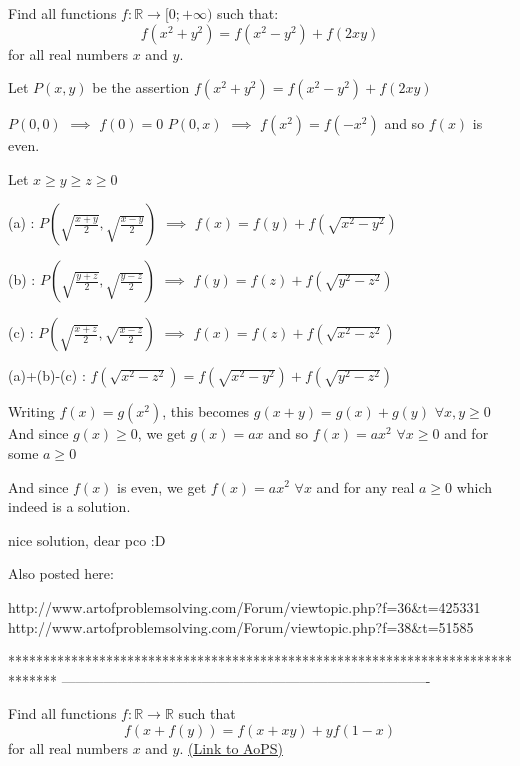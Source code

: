 \begin{solution}
	\begin{tcolorbox}
Find all functions $f: \mathbb{R}\to [0;+\infty)$ such that: 
\[f(x^2+y^2)=f(x^2-y^2)+f(2xy)\]
for all real numbers $x$ and $y$.\end{tcolorbox}
Let $P(x,y)$ be the assertion $f(x^2+y^2)=f(x^2-y^2)+f(2xy)$

$P(0,0)$ $\implies$ $f(0)=0$
$P(0,x)$ $\implies$ $f(x^2)=f(-x^2)$ and so $f(x)$ is even.

Let $x\ge y\ge z\ge 0$

(a) : $P(\sqrt{\frac {x+y}2},\sqrt{\frac{x-y}2})$ $\implies$ $f(x)=f(y)+f(\sqrt{x^2-y^2})$

(b) : $P(\sqrt{\frac {y+z}2},\sqrt{\frac{y-z}2})$ $\implies$ $f(y)=f(z)+f(\sqrt{y^2-z^2})$

(c) : $P(\sqrt{\frac {x+z}2},\sqrt{\frac{x-z}2})$ $\implies$ $f(x)=f(z)+f(\sqrt{x^2-z^2})$

(a)+(b)-(c) : $f(\sqrt{x^2-z^2})=f(\sqrt{x^2-y^2})+f(\sqrt{y^2-z^2})$

Writing $f(x)=g(x^2)$, this becomes $g(x+y)=g(x)+g(y)$ $\forall x,y\ge 0$
And since $g(x)\ge 0$, we get $g(x)=ax$ and so $f(x)=ax^2$ $\forall x\ge 0$ and for some $a\ge 0$

And since $f(x)$ is even, we get $\boxed{f(x)=ax^2}$ $\forall x$ and for any real $a\ge 0$ which indeed is a solution.
\end{solution}



\begin{solution}
	nice solution, dear pco :D
\end{solution}



\begin{solution}
	Also posted here: 

http://www.artofproblemsolving.com/Forum/viewtopic.php?f=36&t=425331
http://www.artofproblemsolving.com/Forum/viewtopic.php?f=38&t=51585
\end{solution}
*******************************************************************************
-------------------------------------------------------------------------------

\begin{problem}
	Find all functions $f:\mathbb{R}\rightarrow\mathbb{R}$ such that
\[f\left(x+f(y)\right)=f(x+xy)+yf(1-x)\]
for all real numbers $x$ and $y$.
	\flushright \href{https://artofproblemsolving.com/community/c6h412726}{(Link to AoPS)}
\end{problem}



